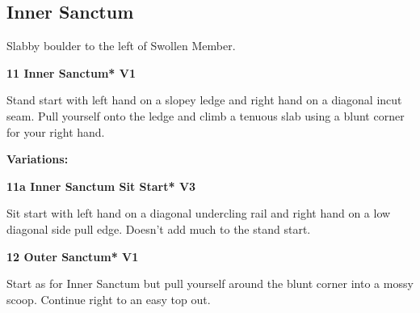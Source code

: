 \begin{multicols}{2}
\begin{minipage}{\columnwidth}
			\subsection*{Inner Sanctum}\label{bf:Inner Sanctum}
			Slabby boulder to the left of Swollen Member.
			
			\end{minipage}
			

					\begin{minipage}{\linewidth}	
					\label{rt:Inner Sanctum}
\colorbox{green!20}{
\parbox{0.95\textwidth}{
\textbf{
11 Inner Sanctum* V1    \warn 
}
}
}

					\begin{adjustwidth}{0.5cm}{}				
					Stand start with left hand on a slopey ledge and right hand on a diagonal incut seam. Pull yourself onto the ledge and climb a tenuous slab using a blunt corner for your right hand.
					\end{adjustwidth}
					\end{minipage}
						\begin{adjustwidth}{0.5cm}{}				
						\textbf{Variations:} \newline
							\begin{minipage}{\linewidth}	
							\label{vr:Inner Sanctum Sit Start}
\colorbox{green!20}{
\parbox{0.95\textwidth}{
\textbf{
11a Inner Sanctum Sit Start* V3   
}
}
}

							\begin{adjustwidth}{0.5cm}{}				
							Sit start with left hand on a diagonal undercling rail and right hand on a low diagonal side pull edge. Doesn't add much to the stand start.
							\end{adjustwidth}
							\end{minipage}
						\end{adjustwidth}
					\begin{minipage}{\linewidth}	
					\label{rt:Outer Sanctum}
\colorbox{green!20}{
\parbox{0.95\textwidth}{
\textbf{
12 Outer Sanctum* V1   
}
}
}

					\begin{adjustwidth}{0.5cm}{}				
					Start as for Inner Sanctum but pull yourself around the blunt corner into a mossy scoop. Continue right to an easy top out.
					\end{adjustwidth}
					\end{minipage}
			\begin{minipage}{\columnwidth}

\end{minipage}
\end{multicols}
